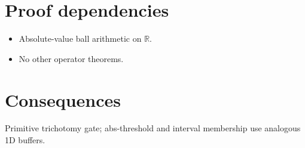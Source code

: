 \documentclass[12pt]{article}
\theoremstyle{plain}
\theoremstyle{definition}
\theoremstyle{remark}
\begin{document}
\section{Proof dependencies}
{\raggedright\sloppy
\begin{itemize}\item Absolute-value ball arithmetic on $\mathbb{R}$.\item No other operator theorems.\end{itemize}
\par}

\section{Consequences}
{\raggedright\sloppy
Primitive trichotomy gate; abs-threshold and interval membership use analogous 1D buffers.
\par}
\end{document}
